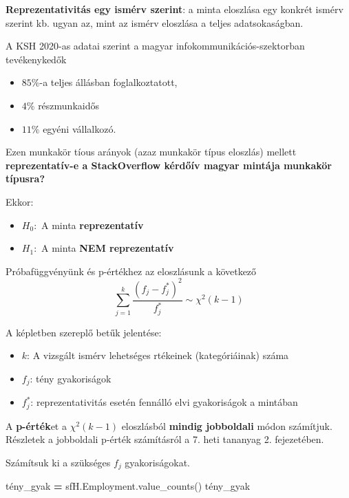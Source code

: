 \documentclass[
]{book}
\newenvironment{Shaded}{\begin{snugshade}}{\end{snugshade}}
\newcommand{\NormalTok}[1]{#1}
\newcommand{\OperatorTok}[1]{\textcolor[rgb]{0.81,0.36,0.00}{\textbf{#1}}}
\providecommand{\tightlist}{%
  \setlength{\itemsep}{0pt}\setlength{\parskip}{0pt}}
\begin{document}
\textbf{Reprezentativitás egy ismérv szerint}: a minta eloszlása egy konkrét ismérv szerint kb. ugyan az, mint az ismérv eloszlása a teljes adatsokaságban.

A KSH 2020-as adatai szerint a magyar infokommunikációs-szektorban tevékenykedők

\begin{itemize}
\tightlist
\item
  \(85\%\)-a teljes állásban foglalkoztatott,
\item
  \(4\%\) részmunkaidős
\item
  \(11\%\) egyéni vállalkozó.
\end{itemize}

Ezen munkakör tíous arányok (azaz munkakör típus eloszlás) mellett \textbf{reprezentatív-e a StackOverflow kérdőív magyar mintája munkakör típusra?}

Ekkor:

\begin{itemize}
\tightlist
\item
  \(H_0:\) A minta \textbf{reprezentatív}
\item
  \(H_1:\) A minta \textbf{NEM reprezentatív}
\end{itemize}

Próbafüggvényünk és p-értékhez az eloszlásunk a következő \[\sum_{j=1}^{k}{\frac{(f_j-f^*_j)^2}{f^*_j}} \sim \chi^2(k-1)\]

A képletben szereplő betűk jelentése:

\begin{itemize}
\tightlist
\item
  \(k\): A vizsgált ismérv lehetséges rtékeinek (kategóriáinak) száma
\item
  \(f_j\): tény gyakoriságok
\item
  \(f^*_j\): reprezentativitás esetén fennálló elvi gyakoriságok a mintában
\end{itemize}

A \textbf{p-érték}et a \(\chi^2(k-1)\) eloszlásból \textbf{mindig jobboldali} módon számítjuk. Részletek a jobboldali p-érték számításról a 7. heti tananyag 2. fejezetében.

Számítsuk ki a szükséges \(f_j\) gyakoriságokat.

\begin{Shaded}
\begin{Highlighting}[]
\NormalTok{tény\_gyak }\OperatorTok{=}\NormalTok{ sfH.Employment.value\_counts()}
\NormalTok{tény\_gyak}
\end{Highlighting}
\end{Shaded}
\end{document}
